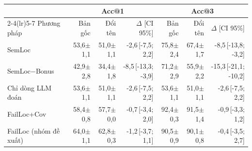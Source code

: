 \begin{tabular}{lrrrrrr}
\toprule
 & \multicolumn{3}{c}{Acc@1} & \multicolumn{3}{c}{Acc@3} \\
\cmidrule(lr){2-4}\cmidrule(lr){5-7}
Phương pháp & Bản gốc & Đổi tên & $\Delta$ [CI 95\%] & Bản gốc & Đổi tên & $\Delta$ [CI 95\%] \\
\midrule
SemLoc & 53,6{\scriptsize$\pm$1,1} & 51,0{\scriptsize$\pm$1,1} & -2,6{\scriptsize\,[-7,5; 2,2]} & 75,8{\scriptsize$\pm$2,4} & 67,4{\scriptsize$\pm$1,7} & -8,5{\scriptsize\,[-13,8; -3,2]} \\
SemLoc−Bonus & 42,9{\scriptsize$\pm$2,8} & 34,4{\scriptsize$\pm$1,8} & -8,5{\scriptsize\,[-13,3; -3,9]} & 71,2{\scriptsize$\pm$2,9} & 55,9{\scriptsize$\pm$2,2} & -15,3{\scriptsize\,[-21,1; -10,2]} \\
Chỉ dòng LLM đoán & 53,6{\scriptsize$\pm$1,1} & 51,0{\scriptsize$\pm$1,1} & -2,6{\scriptsize\,[-7,5; 2,2]} & 53,6{\scriptsize$\pm$1,1} & 51,0{\scriptsize$\pm$1,1} & -2,6{\scriptsize\,[-7,5; 2,2]} \\
FailLoc+Cov & 58,4{\scriptsize$\pm$0,8} & 57,7{\scriptsize$\pm$0,0} & -0,7{\scriptsize\,[-3,4; 2,0]} & 92,4{\scriptsize$\pm$0,3} & 91,5{\scriptsize$\pm$1,4} & -0,9{\scriptsize\,[-3,3; 1,2]} \\
FailLoc (nhóm đề xuất) & 64,0{\scriptsize$\pm$1,1} & 62,8{\scriptsize$\pm$0,3} & -1,2{\scriptsize\,[-3,7; 1,1]} & 90,5{\scriptsize$\pm$0,9} & 90,1{\scriptsize$\pm$0,8} & -0,4{\scriptsize\,[-3,5; 2,7]} \\
\bottomrule
\end{tabular}
